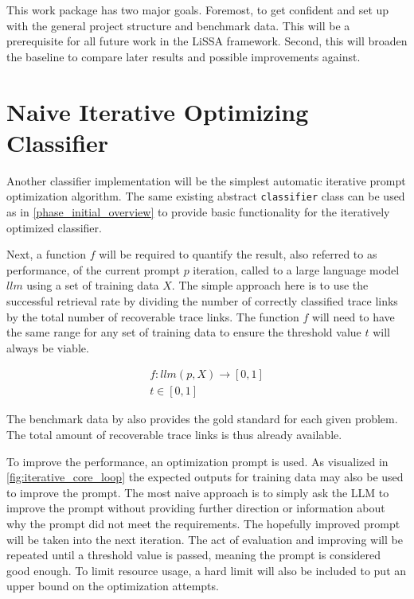This work package has two major goals.
Foremost, to get confident and set up with the general project structure and benchmark data.
This will be a prerequisite for all future work in the LiSSA framework.
Second, this will broaden the baseline to compare later results and possible improvements against.




\section{Naive Iterative Optimizing Classifier}
\label{approach:sec:naive_iterative}
Another classifier implementation will be the simplest automatic iterative prompt optimization algorithm.
The same existing abstract \verb|classifier| class can be used as in \autoref{phase_initial_overview} to provide basic functionality for the iteratively optimized classifier.

Next, a function $f$ will be required to quantify the result, also referred to as performance, of the current prompt $p$ iteration, called to a large language model $llm$ using a set of training data $X$.
The simple approach here is to use the successful retrieval rate by dividing the number of correctly classified trace links by the total number of recoverable trace links.
The function $f$ will need to have the same range for any set of training data to ensure the threshold value $t$ will always be viable.

\begin{align}
        f: llm(p, X) \rightarrow [0, 1] \\
        t \in [0, 1]
\end{align}

The benchmark data by  also provides the gold standard for each given problem.
The total amount of recoverable trace links is thus already available. 

To improve the performance, an optimization prompt is used.
As visualized in \autoref{fig:iterative_core_loop} the expected outputs for training data may also be used to improve the prompt.
The most naive approach is to simply ask the LLM to improve the prompt without providing further direction or information about why the prompt did not meet the requirements.
The hopefully improved prompt will be taken into the next iteration.
The act of evaluation and improving will be repeated until a threshold value is passed, meaning the prompt is considered good enough.
To limit resource usage, a hard limit will also be included to put an upper bound on the optimization attempts.

